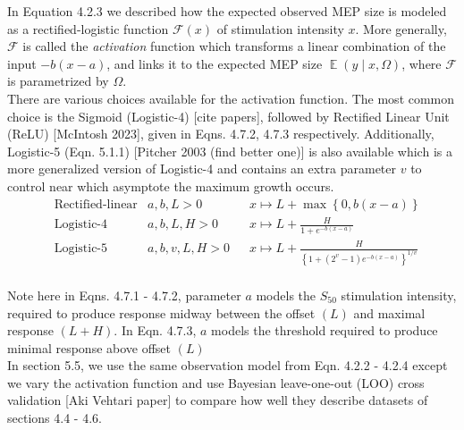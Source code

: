 \documentclass[a4paper,12pt]{article}
\DeclareMathOperator{\E}{\mathbb{E}}
\begin{document}
    In Equation 4.2.3 we described how the expected observed MEP size is modeled as a rectified-logistic function $\mathcal{F}\left(x\right)$ of stimulation intensity $x$. More generally, $\mathcal{F}$ is called the \textit{activation} function which transforms a linear combination of the input $-b(x - a)$, and links it to the expected MEP size $\E(y \mid x, \Omega)$, where $\mathcal{F}$ is parametrized by $\Omega$.\\

    There are various choices available for the activation function. The most common choice is the Sigmoid (Logistic-4) [cite papers], followed by Rectified Linear Unit (ReLU) [McIntosh 2023], given in Eqns. 4.7.2, 4.7.3 respectively. Additionally, Logistic-5 (Eqn. 5.1.1) [Pitcher 2003 (find better one)] is also available which is a more generalized version of Logistic-4 and contains an extra parameter $v$ to control near which asymptote the maximum growth occurs.\\
    \begin{align*}
        &\text{Rectified-linear} & a, b, L > 0\ \;\;&x \mapsto L + \max\left\{0, b\left(x - a\right)\right\}  \tag{4.1.1}\\
        &\text{Logistic-4} & a, b, L, H > 0\ \;\;&x \mapsto L + \frac{H}{1 + e^{-b\left(x-a\right)}}  \tag{4.1.2}\\
        &\text{Logistic-5} & a, b, v, L, H > 0\ \;\;&x \mapsto L + \frac{H}{\left\{1 + \left(2^v - 1\right)e^{-b\left(x-a\right)}\right\}^{1/v}}  \tag{4.1.3}\\
    \end{align*}

    Note here in Eqns. 4.7.1 - 4.7.2, parameter $a$ models the $S_{50}$ stimulation intensity, required to produce response midway between the offset $(L)$ and maximal response $(L + H)$. In Eqn. 4.7.3, $a$ models the threshold required to produce minimal response above offset $(L)$\\

    In section 5.5, we use the same observation model from Eqn. 4.2.2 - 4.2.4 except we vary the activation function and use Bayesian leave-one-out (LOO) cross validation [Aki Vehtari paper] to compare how well they describe datasets of sections 4.4 - 4.6.
\end{document}
